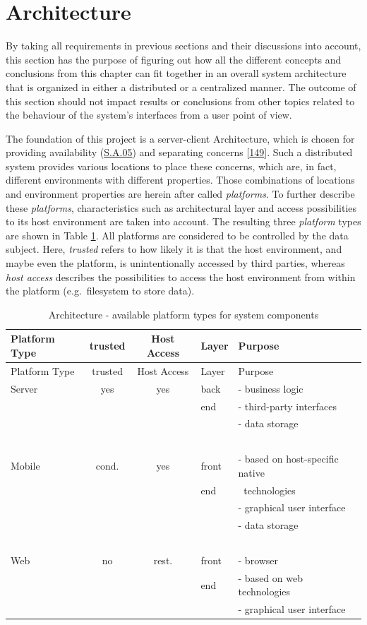 \documentclass[12pt,english,a4paper,titlepage,cleardoublepage=empty,dottedtoc]{report}
\begin{document}
\section{Architecture}\label{architecture}

By taking all requirements in previous sections and their discussions
into account, this section has the purpose of figuring out how all the
different concepts and conclusions from this chapter can fit together in
an overall system architecture that is organized in either a distributed
or a centralized manner. The outcome of this section should not impact
results or conclusions from other topics related to the behaviour of the
system's interfaces from a user point of view.

The foundation of this project is a server-client Architecture, which is
chosen for providing availability (\protect\hyperlink{sa05}{S.A.05}) and
separating concerns
{[}\protect\hyperlink{ref-web_2016_wikipedia_separation-of-concerns}{149}{]}.
Such a distributed system provides various locations to place these
concerns, which are, in fact, different environments with different
properties. Those combinations of locations and environment properties
are herein after called \emph{platforms}. To further describe these
\emph{platforms}, characteristics such as architectural layer and access
possibilities to its host environment are taken into account. The
resulting three \emph{platform} types are shown in Table
\ref{tbl:platforms-characteristics}. All platforms are considered to be
controlled by the data subject. Here, \emph{trusted} refers to how
likely it is that the host environment, and maybe even the platform, is
unintentionally accessed by third parties, whereas \emph{host access}
describes the possibilities to access the host environment from within
the platform (e.g.~filesystem to store data).

\begin{longtable}[]{@{}lccll@{}}
\caption{Architecture - available platform types for system components
\label{tbl:platforms-characteristics}}\tabularnewline
\toprule
Platform Type & trusted & Host Access & Layer & Purpose\tabularnewline
\midrule
\endfirsthead
\toprule
Platform Type & trusted & Host Access & Layer & Purpose\tabularnewline
\midrule
\endhead
Server & yes & yes & back & - business logic\tabularnewline
\(\ \) & \(\ \) & \(\ \) & end & - third-party interfaces\tabularnewline
\(\ \) & \(\ \) & \(\ \) & \(\ \) & - data storage\tabularnewline
\(\ \) & \(\ \) & \(\ \) & \(\ \) & \(\ \)\tabularnewline
Mobile & cond. & yes & front & - based on host-specific
native\tabularnewline
\(\ \) & \(\ \) & \(\ \) & end & \(\ \) technologies\tabularnewline
\(\ \) & \(\ \) & \(\ \) & \(\ \) & - graphical user
interface\tabularnewline
\(\ \) & \(\ \) & \(\ \) & \(\ \) & - data storage\tabularnewline
\(\ \) & \(\ \) & \(\ \) & \(\ \) & \(\ \)\tabularnewline
Web & no & rest. & front & - browser\tabularnewline
\(\ \) & \(\ \) & \(\ \) & end & - based on web
technologies\tabularnewline
\(\ \) & \(\ \) & \(\ \) & \(\ \) & - graphical user
interface\tabularnewline
\bottomrule
\end{longtable}
\end{document}
